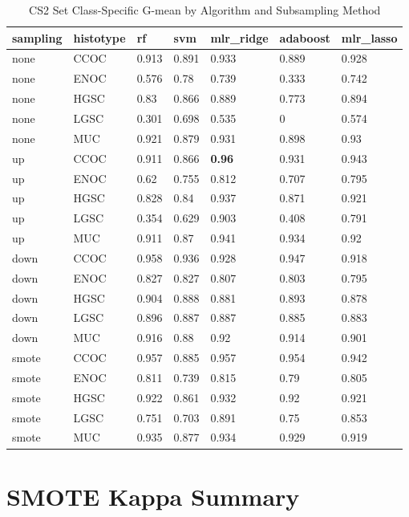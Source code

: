\documentclass[
]{report}
\begin{document}
\begin{table}

\caption{\label{tab:cs2-gmean-class-table}CS2 Set Class-Specific G-mean by Algorithm and Subsampling Method}
\centering
\begin{tabular}[t]{l|l|l|l|l|l|l}
\hline
sampling & histotype & rf & svm & mlr\_ridge & adaboost & mlr\_lasso\\
\hline
none & CCOC & 0.913 & 0.891 & 0.933 & 0.889 & 0.928\\
\hline
none & ENOC & 0.576 & 0.78 & 0.739 & 0.333 & 0.742\\
\hline
none & HGSC & 0.83 & 0.866 & 0.889 & 0.773 & 0.894\\
\hline
none & LGSC & 0.301 & 0.698 & 0.535 & 0 & 0.574\\
\hline
none & MUC & 0.921 & 0.879 & 0.931 & 0.898 & 0.93\\
\hline
up & CCOC & 0.911 & 0.866 & \textbf{0.96} & 0.931 & 0.943\\
\hline
up & ENOC & 0.62 & 0.755 & 0.812 & 0.707 & 0.795\\
\hline
up & HGSC & 0.828 & 0.84 & 0.937 & 0.871 & 0.921\\
\hline
up & LGSC & 0.354 & 0.629 & 0.903 & 0.408 & 0.791\\
\hline
up & MUC & 0.911 & 0.87 & 0.941 & 0.934 & 0.92\\
\hline
down & CCOC & 0.958 & 0.936 & 0.928 & 0.947 & 0.918\\
\hline
down & ENOC & 0.827 & 0.827 & 0.807 & 0.803 & 0.795\\
\hline
down & HGSC & 0.904 & 0.888 & 0.881 & 0.893 & 0.878\\
\hline
down & LGSC & 0.896 & 0.887 & 0.887 & 0.885 & 0.883\\
\hline
down & MUC & 0.916 & 0.88 & 0.92 & 0.914 & 0.901\\
\hline
smote & CCOC & 0.957 & 0.885 & 0.957 & 0.954 & 0.942\\
\hline
smote & ENOC & 0.811 & 0.739 & 0.815 & 0.79 & 0.805\\
\hline
smote & HGSC & 0.922 & 0.861 & 0.932 & 0.92 & 0.921\\
\hline
smote & LGSC & 0.751 & 0.703 & 0.891 & 0.75 & 0.853\\
\hline
smote & MUC & 0.935 & 0.877 & 0.934 & 0.929 & 0.919\\
\hline
\end{tabular}
\end{table}

\hypertarget{smote-kappa-summary}{%
\section{SMOTE Kappa Summary}\label{smote-kappa-summary}}
\end{document}
